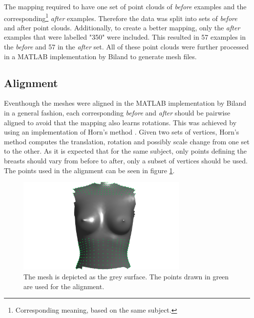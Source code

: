 The mapping required to have one set of point clouds of \textit{before} examples and the corresponding\footnote{Corresponding meaning, based on the same subject.} \textit{after} examples. Therefore the data was split into sets of \textit{before} and after point clouds. Additionally, to create a better mapping, only the \textit{after} examples that were labelled "350" were included. This resulted in 57 examples in the \textit{before} and 57 in the \textit{after} set. All of these point clouds were further processed in a MATLAB implementation by Biland \cite{Biland17} to generate mesh files.

\subsection{Alignment}
\label{align}
Eventhough the meshes were aligned in the MATLAB implementation by Biland \cite{Biland17} in a general fashion, each corresponding \textit{before} and \textit{after} should be pairwise aligned to avoid that the mapping also learns rotations. This was achieved by using an implementation of Horn's method \cite{horn1987closed}. Given two sets of vertices, Horn's method computes the translation, rotation and possibly scale change from one set to the other. As it is expected that for the same subject, only points defining the breasts should vary from before to after, only a subset of vertices should be used. The points used in the alignment can be seen in figure \ref{fig:alignment}.

\begin{figure}[h]
\centering
\includegraphics[width=0.75\textwidth]{figures/alignment}
\caption{The mesh is depicted as the grey surface. The points drawn in green are used for the alignment.}
\label{fig:alignment}
\end{figure}

